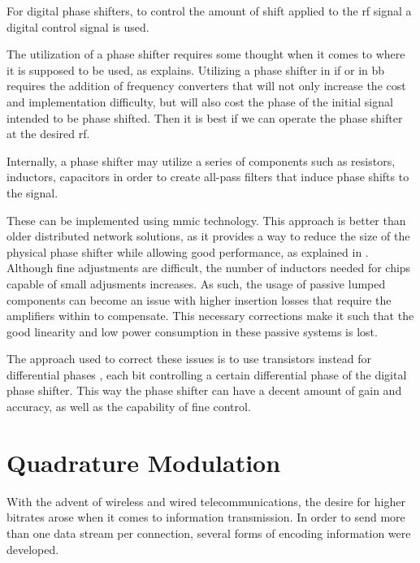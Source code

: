 \par For digital phase shifters, to control the amount of shift applied to the \ac{rf} signal a digital control signal is used.

\par The utilization of a phase shifter requires some thought when it comes to where it is supposed to be used, as \cite{Mitilineos2005AImplementation} explains. Utilizing a phase shifter in \ac{if} or in \ac{bb} requires the addition of frequency converters that will not only increase the cost and implementation difficulty, but will also cost the phase of the initial signal intended to be phase shifted. Then it is best if we can operate the phase shifter at the desired \ac{rf}.

\par Internally, a phase shifter may utilize a series of components such as resistors, inductors, capacitors \cite{Mitilineos2005AImplementation} in order to create all-pass filters that induce phase shifts to the signal.

\par These can be implemented using \ac{mmic} technology. This approach is better than older distributed network solutions, as it provides a way to reduce the size of the physical phase shifter while allowing good performance, as explained in \cite{Koh20070.13-mArrays}. Although fine adjustments are difficult, the number of inductors needed for chips capable of small adjusments increases. As such, the usage of passive lumped components can become an issue with higher insertion losses that require the amplifiers within to compensate. This necessary corrections make it such that the good linearity and low power consumption in these passive systems is lost.

\par The approach used to correct these issues is to use transistors instead for differential phases \cite{Koh20070.13-mArrays}, each bit controlling a certain differential phase of the digital phase shifter. This way the phase shifter can have a decent amount of gain and accuracy, as well as the capability of fine control.

\section{Quadrature Modulation}
\par With the advent of wireless and wired telecommunications, the desire for higher bitrates arose when it comes to information transmission. In order to send more than one data stream per connection, several forms of encoding information were developed.

